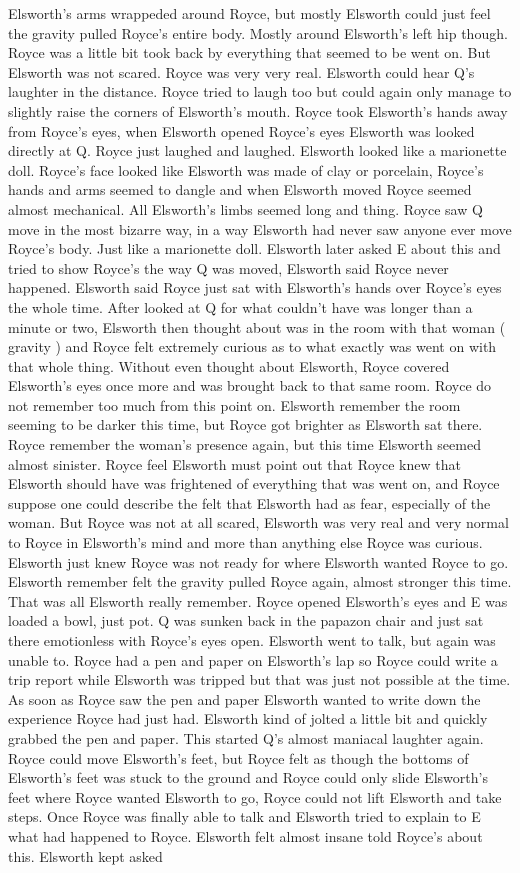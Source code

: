 \documentclass[12pt]{book}
\begin{document}
Elsworth's arms wrappeded around Royce, but mostly Elsworth could just feel the gravity pulled Royce's entire body. Mostly around Elsworth's left hip though. Royce was a little bit took back by everything that seemed to be went on. But Elsworth was not scared. Royce was very very real. Elsworth could hear Q's laughter in the distance. Royce tried to laugh too but could again only manage to slightly raise the corners of Elsworth's mouth. Royce took Elsworth's hands away from Royce's eyes, when Elsworth opened Royce's eyes Elsworth was looked directly at Q. Royce just laughed and laughed. Elsworth looked like a marionette doll. Royce's face looked like Elsworth was made of clay or porcelain, Royce's hands and arms seemed to dangle and when Elsworth moved Royce seemed almost mechanical. All Elsworth's limbs seemed long and thing. Royce saw Q move in the most bizarre way, in a way Elsworth had never saw anyone ever move Royce's body. Just like a marionette doll. Elsworth later asked E about this and tried to show Royce's the way Q was moved, Elsworth said Royce never happened. Elsworth said Royce just sat with Elsworth's hands over Royce's eyes the whole time. After looked at Q for what couldn't have was longer than a minute or two, Elsworth then thought about was in the room with that woman ( gravity ) and Royce felt extremely curious as to what exactly was went on with that whole thing. Without even thought about Elsworth, Royce covered Elsworth's eyes once more and was brought back to that same room. Royce do not remember too much from this point on. Elsworth remember the room seeming to be darker this time, but Royce got brighter as Elsworth sat there. Royce remember the woman's presence again, but this time Elsworth seemed almost sinister. Royce feel Elsworth must point out that Royce knew that Elsworth should have was frightened of everything that was went on, and Royce suppose one could describe the felt that Elsworth had as fear, especially of the woman. But Royce was not at all scared, Elsworth was very real and very normal to Royce in Elsworth's mind and more than anything else Royce was curious. Elsworth just knew Royce was not ready for where Elsworth wanted Royce to go. Elsworth remember felt the gravity pulled Royce again, almost stronger this time. That was all Elsworth really remember. Royce opened Elsworth's eyes and E was loaded a bowl, just pot. Q was sunken back in the papazon chair and just sat there emotionless with Royce's eyes open. Elsworth went to talk, but again was unable to. Royce had a pen and paper on Elsworth's lap so Royce could write a trip report while Elsworth was tripped but that was just not possible at the time. As soon as Royce saw the pen and paper Elsworth wanted to write down the experience Royce had just had. Elsworth kind of jolted a little bit and quickly grabbed the pen and paper. This started Q's almost maniacal laughter again. Royce could move Elsworth's feet, but Royce felt as though the bottoms of Elsworth's feet was stuck to the ground and Royce could only slide Elsworth's feet where Royce wanted Elsworth to go, Royce could not lift Elsworth and take steps. Once Royce was finally able to talk and Elsworth tried to explain to E what had happened to Royce. Elsworth felt almost insane told Royce's about this. Elsworth kept asked 
\end{document}
